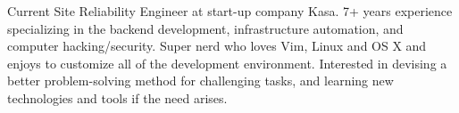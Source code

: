 
\begin{cvparagraph}

  Current Site Reliability Engineer at start-up company Kasa. 7+ years experience specializing in the backend
  development, infrastructure automation, and computer hacking/security. Super nerd who loves Vim, Linux and
  OS X and enjoys to customize all of the development environment. Interested in devising a better
  problem-solving method for challenging tasks, and learning new technologies and tools if the need arises.
\end{cvparagraph}
